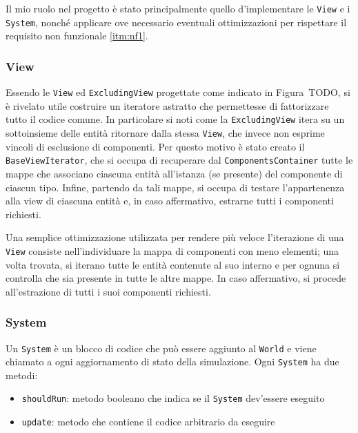 Il mio ruolo nel progetto è stato principalmente quello d'implementare le \texttt{View} e i \texttt{System}, nonché
applicare ove necessario eventuali ottimizzazioni per rispettare il requisito non funzionale \ref{itm:nf1}.

\subsubsection{View}

Essendo le \texttt{View} ed \texttt{ExcludingView} progettate come indicato in Figura~TODO, si è rivelato utile costruire un
iteratore astratto che permettesse di fattorizzare tutto il codice comune.
In particolare si noti come la \texttt{ExcludingView} itera su un sottoinsieme delle entità ritornare dalla stessa
\texttt{View}, che invece non esprime vincoli di esclusione di componenti.
Per questo motivo è stato creato il \texttt{BaseViewIterator}, che si occupa di recuperare dal
\texttt{ComponentsContainer} tutte le mappe che associano ciascuna entità all'istanza (se presente) del componente di
ciascun tipo.
Infine, partendo da tali mappe, si occupa di testare l'appartenenza alla view di ciascuna entità e, in caso affermativo,
estrarne tutti i componenti richiesti.

Una semplice ottimizzazione utilizzata per rendere più veloce l'iterazione di una \texttt{View} consiste nell'individuare
la mappa di componenti con meno elementi;
una volta trovata, si iterano tutte le entità contenute al suo interno e per ognuna si controlla che sia presente in tutte
le altre mappe.
In caso affermativo, si procede all'estrazione di tutti i suoi componenti richiesti.

\subsubsection{System}

Un \texttt{System} è un blocco di codice che può essere aggiunto al \texttt{World} e viene chiamato a ogni aggiornamento
di stato della simulazione.
Ogni \texttt{System} ha due metodi:
\begin{itemize}
    \item \texttt{shouldRun}: metodo booleano che indica se il \texttt{System} dev'essere eseguito
    \item \texttt{update}: metodo che contiene il codice arbitrario da eseguire
\end{itemize}

